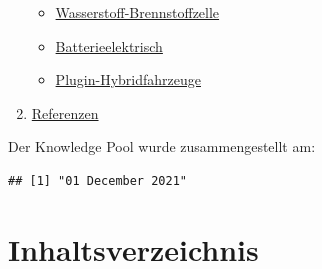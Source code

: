 \documentclass[
]{book}
\providecommand{\tightlist}{%
  \setlength{\itemsep}{0pt}\setlength{\parskip}{0pt}}
\begin{document}
\begin{enumerate}
  \begin{itemize}
  \tightlist
  \item
    \protect\hyperlink{FCEV}{Wasserstoff-Brennstoffzelle}\\
  \item
    \protect\hyperlink{bev}{Batterieelektrisch}\\
  \item
    \protect\hyperlink{plugin_hybrid}{Plugin-Hybridfahrzeuge}\\
  \end{itemize}
\item
  \protect\hyperlink{reference}{Referenzen}
\end{enumerate}

Der Knowledge Pool wurde zusammengestellt am:

\begin{verbatim}
## [1] "01 December 2021"
\end{verbatim}

\hypertarget{inhaltsverzeichnis}{%
\chapter*{Inhaltsverzeichnis}\label{inhaltsverzeichnis}}
\end{document}
